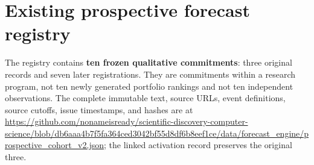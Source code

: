 \documentclass[11pt]{article}
\begin{document}
\section{Existing prospective forecast registry}\label{sec:registry}
The registry contains \textbf{ten frozen qualitative commitments}: three original records and seven later registrations. They are commitments within a research program, not ten newly generated portfolio rankings and not ten independent observations. The complete immutable text, source URLs, event definitions, source cutoffs, issue timestamps, and hashes are at \url{https://github.com/nonameisready/scientific-discovery-computer-science/blob/db6aaa4b7f5fa364ced3042bf55d8df6b8eef1ce/data/forecast_engine/prospective_cohort_v2.json}; the linked activation record preserves the original three.

\small
\end{document}
